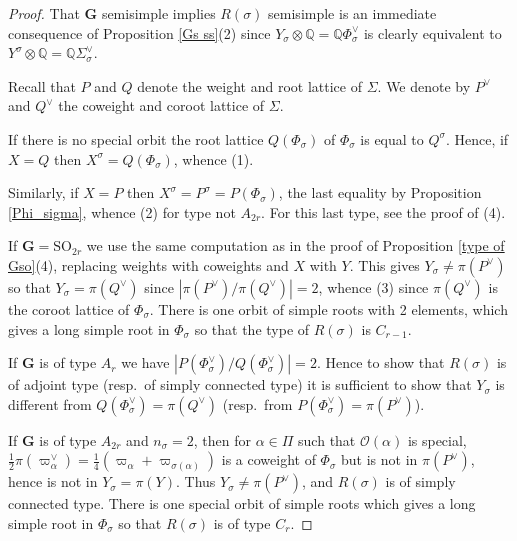 \documentclass{amsart}
\numberwithin{equation}{section}
\theoremstyle{definition}
\theoremstyle{remark}
\newcommand\bG{{\mathbf G}}
\newcommand\BQ{{\mathbb Q}}
\newcommand\CO{{\mathcal O}}
\newcommand\SO{\mathrm{SO}}
\begin{document}
\begin{proof}
That $\bG$ semisimple implies $R(\sigma)$ semisimple
is an immediate consequence of Proposition \ref{Gs ss}(2) since
$Y_\sigma\otimes\BQ=\BQ\Phi^\vee_\sigma$ is clearly equivalent to
$Y^\sigma\otimes\BQ=\BQ\Sigma_\sigma^\vee$.

Recall that $P$ and $Q$ denote the weight and root lattice of
$\Sigma$. We denote by $P^\vee$ and  $Q^\vee$ 
the coweight and  coroot lattice of $\Sigma$.

If there is no special orbit the root lattice $Q(\Phi_\sigma)$ of
$\Phi_\sigma$ is equal to $Q^\sigma$.
Hence, if $X=Q$ then $X^\sigma=Q(\Phi_\sigma)$, whence (1).

Similarly, if $X=P$ then $X^\sigma=P^\sigma=P(\Phi_\sigma)$,
the last equality by Proposition \ref{Phi_sigma}, whence (2) for type
not $A_{2r}$. For this last type, see the proof of (4).

If $\bG=\SO_{2r}$ we use the same computation as in the proof of
Proposition \ref{type of Gso}(4), replacing weights with coweights
and $X$ with $Y$. This gives
$Y_\sigma\neq\pi(P^\vee)$ so that
$Y_\sigma=\pi(Q^\vee)$ since $|\pi(P^\vee)/\pi(Q^\vee)|=2$,
whence (3) since $\pi(Q^\vee)$ is the coroot lattice of
$\Phi_\sigma$. There is one orbit of simple
roots with 2 elements, which gives a long simple root in $\Phi_\sigma$
so that the type of $R(\sigma)$ is $C_{r-1}$.

If $\bG$ is of type $A_r$ we have $|P(\Phi_\sigma^\vee)/Q(\Phi_\sigma^\vee)|=2$.
Hence to show that $R(\sigma)$ is of adjoint type (resp.~of simply connected type) it is
sufficient to show that $Y_\sigma$ is different from $Q(\Phi_\sigma^\vee)=
\pi(Q^\vee)$ (resp.~from $P(\Phi_\sigma^\vee)=\pi(P^\vee)$).

If $\bG$ is of type $A_{2r}$ and $n_\sigma=2$, then
for $\alpha\in\Pi$ such that $\CO(\alpha)$ is special,  
$\frac12\pi(\varpi_\alpha^\vee)=\frac14(\varpi_\alpha+\varpi_{\sigma(\alpha)})$
is a coweight of $\Phi_\sigma$ but is not in $\pi(P^\vee)$,
hence is not in $Y_\sigma=\pi(Y)$. Thus $Y_\sigma\neq \pi(P^\vee)$, and
$R(\sigma)$ is of simply connected type. There is one special orbit of simple roots
which gives a long simple root in $\Phi_\sigma$ so that $R(\sigma)$ is of type
$C_r$.


\end{proof}
\end{document}
